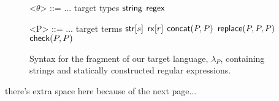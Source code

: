 \documentclass{acm_proc_article-sp}
\theoremstyle{definition}
\newcommand{\reduces}{ \Rightarrow }
\newcommand{\lambdap}{\lambda_P}
\newcommand{\sistr}[1]{{\sf rstr}[#1]}   \newcommand{\rstr}[1]{{\sf rstr}[#1]} %
\newcommand{\strin}[1]{\sistr{#1}}
\newcommand{\tsubst}[3]{{\sf replace}(#1,#2,#3)} \newcommand{\metareplace}[3]{{\sf replace}(#1,#2,#3)} %
\newcommand{\tcheck}[2]{{\sf check}(#1, #2)}
\renewcommand{\tstr}[1]{{{\sf str}[#1]}}
\newcommand{\tconcat}[2]{{\sf concat}(#1,#2)}
\newcommand{\rx}[1]{ {\sf rx}[#1] }
\newcommand{\str}{{\sf string}}
\newcommand{\regex}{{\sf regex}}
\newcommand{\treduces}{ \Downarrow }
\newcommand{\lcs}{\lambda_{CS}}
\begin{document}
\begin{figure}
\begin{grammar}

<$\theta$> ::= ... \hfill target types \alt
$\str$ \alt $\regex$


<P> ::= ... \hfill target terms \alt
  $\tstr{s}$ \alt
  $\rx{r}$ \alt
  $\tconcat{P}{P}$ \alt
  $\tsubst{P}{P}{P}$ \alt
  $\tcheck{P}{P}$ 
  \end{grammar}
\caption{Syntax for the fragment of our target language, $\lambdap$, containing strings and statically constructed regular expressions.}
\label{fig:lcsSyntax}
\end{figure}

there's extra space here because of the next page...

%
%
%
%
%
%
%
\end{document}
